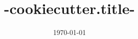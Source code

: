 \documentclass[12pt]{article}
\title{ {{-cookiecutter.title-}} }
\date{\today}
\begin{document}
\mytitlepage
\end{document}
